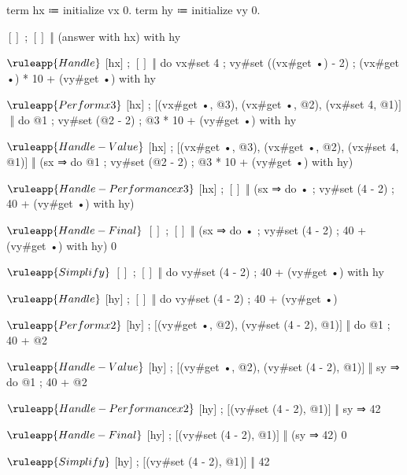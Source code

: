 \begin{snippet}
term hx ≔ initialize vx 0.
term hy ≔ initialize vy 0.

$[]$ ; $[]$ ‖ (answer with hx) with hy

$\ruleapp{Handle}$
$[$hx$]$ ; $[]$$ $
 $ $‖ do
    { vx#set 4
    ; vy#set ((vx#get •) - 2)
    ; (vx#get •) * 10 + (vy#get •) }
  with hy

$\ruleapp{Perform x3}$
$[$hx$]$ ; $[$(vx#get •, @3), (vx#get •, @2), (vx#set 4, @1)$]$ $ $
  $ $‖ do{ @1 ; vy#set (@2 - 2) ; @3 * 10 + (vy#get •) }
    with hy

$\ruleapp{Handle-Value}$
$[$hx$]$ ; $[$(vx#get •, @3), (vx#get •, @2), (vx#set 4, @1)$]$$ $
 $ $‖ (sx ⇒ do{ @1 ; vy#set (@2 - 2) ; @3 * 10 + (vy#get •) } with hy)

$\ruleapp{Handle-Performance x3}$
$[$hx$]$ ; $[]$$ $
 $ $‖ (sx ⇒ do{ • ; vy#set (4 - 2) ; 40 + (vy#get •) } with hy)

$\ruleapp{Handle-Final}$
$[]$ ; $[]$$ $
 $ $‖ (sx ⇒ do{ • ; vy#set (4 - 2) ; 40 + (vy#get •) } with hy)
      0

$\ruleapp{Simplify}$
$[]$ ; $[]$ ‖ do{ vy#set (4 - 2) ; 40 + (vy#get •) } with hy

$\ruleapp{Handle}$
$[$hy$]$ ; $[]$ ‖ do{ vy#set (4 - 2) ; 40 + (vy#get •) }

$\ruleapp{Perform x2}$
$[$hy$]$ ; $[$(vy#get •, @2), (vy#set (4 - 2), @1)$]$ ‖ do{ @1 ; 40 + @2 }

$\ruleapp{Handle-Value}$
$[$hy$]$ ; $[$(vy#get •, @2), (vy#set (4 - 2), @1)$]$ ‖ sy ⇒ do{ @1 ; 40 + @2 }

$\ruleapp{Handle-Performance x2}$
$[$hy$]$ ; $[$(vy#set (4 - 2), @1)$]$ ‖ sy ⇒ 42

$\ruleapp{Handle-Final}$
$[$hy$]$ ; $[$(vy#set (4 - 2), @1)$]$ ‖ (sy ⇒ 42) 0

$\ruleapp{Simplify}$
$[$hy$]$ ; $[$(vy#set (4 - 2), @1)$]$ ‖ 42
\end{snippet}
